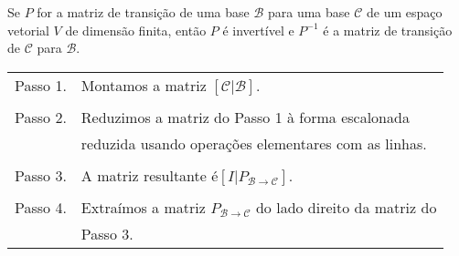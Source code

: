 \documentclass{beamer}
\begin{document}
\begin{frame}
	\begin{teorema}
		Se $P$ for a matriz de transição de uma base $\mathcal{B}$ para uma base $\mathcal{C}$ de um espaço vetorial $V$ de dimensão finita, então $P$ é invertível e $P^{-1}$ é a matriz de transição de $\mathcal{C}$ para $\mathcal{B}$.
	\end{teorema}
\end{frame}

\begin{frame}
	\begin{tcolorbox}[colback=green!30, colframe=green!80!blue, title=Procedimento para calcular $P_{\mathcal{B} \to \mathcal{C}}$]
			\begin{tabular}{ll}
				Passo 1. & Montamos a matriz $[\mathcal{C} | \mathcal{B}]$.\\
				\\
				Passo 2. & Reduzimos a matriz do Passo 1 à forma escalonada\\
				& reduzida usando operações elementares com as linhas.\\
				\\
				Passo 3. & A matriz resultante é$[I | P_{\mathcal{B} \to \mathcal{C}}]$.\\
				\\
				Passo 4. & Extraímos a matriz $P_{\mathcal{B} \to \mathcal{C}}$ do lado direito da matriz do\\
				& Passo 3.
			\end{tabular}
	\end{tcolorbox}		
\end{frame}
\end{document}
